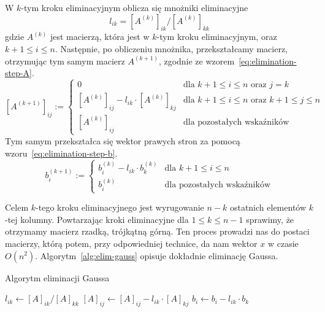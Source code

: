 \documentclass[../main.tex]{subfiles}
\begin{document}
    W \( k \)-tym kroku eliminacyjnym oblicza się mnożniki eliminacyjne
    \[ l_{ik} = [A^{(k)}]_{ik}/[A^{(k)}]_{kk} \] gdzie \( A^{(k)} \)
    jest macierzą, która jest w \( k \)-tym kroku eliminacyjnym,
    oraz \( k + 1 \le i \le n \).
    Następnie, po obliczeniu mnożnika, przekształcamy macierz,
    otrzymując tym samym macierz \( A^{(k + 1)} \), zgodnie
    ze wzorem~\ref{eq:elimination-step-A}.
    \begin{equation} \label{eq:elimination-step-A}
      [A^{(k + 1)}]_{ij} := \begin{cases}
        0 & \text{dla $k + 1 \le i \le n$ oraz $j = k$} \\
        [A^{(k)}]_{ij} - l_{ik} \cdot [A^{(k)}]_{kj} & \text{dla $k + 1 \le i \le n$ oraz $k + 1 \le
        j \le n$} \\
        [A^{(k)}]_{ij} & \text{dla pozostałych wskaźników}
      \end{cases}
    \end{equation}
    Tym samym przekształca się wektor prawych stron za pomocą wzoru~\ref{eq:elimination-step-b}.
    \begin{equation} \label{eq:elimination-step-b}
      b^{(k + 1)}_i := \begin{cases}
        b^{(k)}_i - l_{ik} \cdot b^{(k)}_k & \text{dla $k + 1 \le i \le n$} \\
        b^{(k)}_i & \text{dla pozostałych wskaźników}
      \end{cases}
    \end{equation}

    Celem \( k \)-tego kroku eliminacyjnego jest wyrugowanie \( n - k \) ostatnich elementów
    \( k \)-tej kolumny. Powtarzając kroki eliminacyjne dla \( 1 \le k \le n-1 \) 
    sprawimy, że otrzymamy macierz rzadką, trójkątną górną.
    Ten proces prowadzi nas do postaci macierzy, którą potem, przy odpowiedniej
    technice, da nam wektor \( x \) w czasie \( O(n^2) \). Algorytm~\ref{alg:elim-gauss}
    opisuje dokładnie eliminację Gaussa.

    \begin{algorithm}
      \caption{Algorytm eliminacji Gaussa}
      \label{alg:elim-gauss}
      \begin{algorithmic}[1]
             
              \State $l_{ik} \gets [A]_{ik} / [A]_{kk}$ 
               
                \State $[A]_{ij} \gets [A]_{ij} - l_{ik} \cdot [A]_{kj}$
              \EndFor
              \State $b_i \gets b_i - l_{ik} \cdot b_k$ 
            \EndFor
          \EndFor
        \EndProcedure
      \end{algorithmic}
    \end{algorithm}
\end{document}
